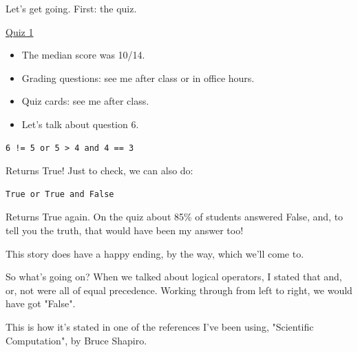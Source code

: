 %






\Large



Let's get going. First: the quiz. 

\begin{board}
\underline{Quiz 1}
\begin{itemize}
\item The median score was 10/14.
\item Grading questions: see me after class or in office hours.
\item Quiz cards: see me after class.
\item Let's talk about question 6.
\end{itemize}
\end{board}

\begin{lstlisting}
6 != 5 or 5 > 4 and 4 == 3
\end{lstlisting}

Returns True! Just to check, we can also do:

\begin{lstlisting}
True or True and False
\end{lstlisting}

Returns True again. On the quiz about 85\% of students answered False, and, to tell you the truth, that would have been my answer too!

This story does have a happy ending, by the way, which we'll come to.

So what's going on? When we talked about logical operators, I stated that and, or, not were all of equal precedence. Working through from left to right, we would have got "False".

This is how it's stated in one of the references I've been using, "Scientific Computation", by Bruce Shapiro.

